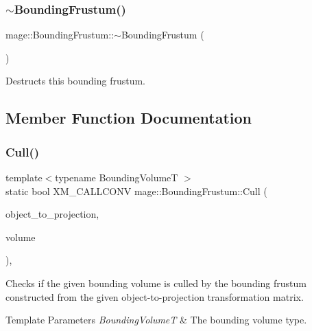 \subsubsection{\texorpdfstring{$\sim$\+Bounding\+Frustum()}{~BoundingFrustum()}}
{\footnotesize\ttfamily mage\+::\+Bounding\+Frustum\+::$\sim$\+Bounding\+Frustum (\begin{DoxyParamCaption}{ }\end{DoxyParamCaption})\hspace{0.3cm}{\ttfamily [default]}}

Destructs this bounding frustum. 

\subsection{Member Function Documentation}
\mbox{\label{classmage_1_1_bounding_frustum_af2080fda86e99ae8dda866b7a90f84a1}} 
\subsubsection{\texorpdfstring{Cull()}{Cull()}}
{\footnotesize\ttfamily template$<$typename Bounding\+VolumeT $>$ \\
static bool X\+M\+\_\+\+C\+A\+L\+L\+C\+O\+NV mage\+::\+Bounding\+Frustum\+::\+Cull (\begin{DoxyParamCaption}\item[{F\+X\+M\+M\+A\+T\+R\+IX}]{object\+\_\+to\+\_\+projection,  }\item[{const Bounding\+VolumeT \&}]{volume }\end{DoxyParamCaption})\hspace{0.3cm}{\ttfamily [static]}, {\ttfamily [noexcept]}}

Checks if the given bounding volume is culled by the bounding frustum constructed from the given object-\/to-\/projection transformation matrix.


\begin{DoxyTemplParams}{Template Parameters}
{\em Bounding\+VolumeT} & The bounding volume type. \\
\hline
\end{DoxyTemplParams}

